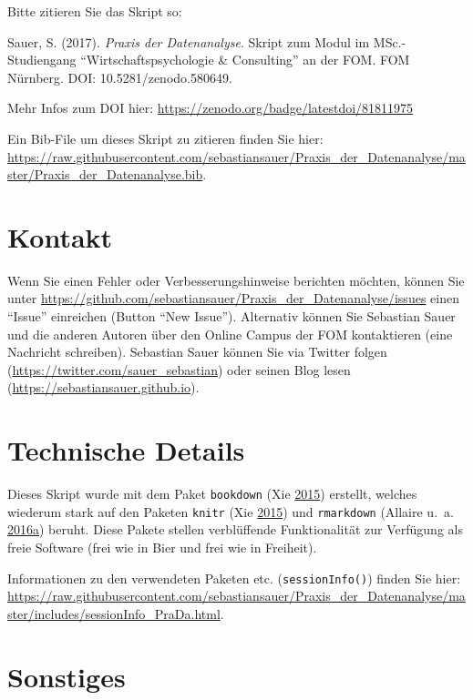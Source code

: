 \documentclass[12pt,ngerman,]{book}
\theoremstyle{definition}
\theoremstyle{definition}
\theoremstyle{remark}
\begin{document}
Bitte zitieren Sie das Skript so:

Sauer, S. (2017). \emph{Praxis der Datenanalyse}. Skript zum Modul im
MSc.-Studiengang ``Wirtschaftspsychologie \& Consulting'' an der FOM.
FOM Nürnberg. DOI: 10.5281/zenodo.580649.

Mehr Infos zum DOI hier:
\url{https://zenodo.org/badge/latestdoi/81811975}

Ein Bib-File um dieses Skript zu zitieren finden Sie hier:
\url{https://raw.githubusercontent.com/sebastiansauer/Praxis_der_Datenanalyse/master/Praxis_der_Datenanalyse.bib}.

\section{Kontakt}\label{kontakt}

Wenn Sie einen Fehler oder Verbesserungshinweise berichten möchten,
können Sie unter
\url{https://github.com/sebastiansauer/Praxis_der_Datenanalyse/issues}
einen ``Issue'' einreichen (Button ``New Issue''). Alternativ können Sie
Sebastian Sauer und die anderen Autoren über den Online Campus der FOM
kontaktieren (eine Nachricht schreiben). Sebastian Sauer können Sie via
Twitter folgen (\url{https://twitter.com/sauer_sebastian}) oder seinen
Blog lesen (\url{https://sebastiansauer.github.io}).

\section{Technische Details}\label{technische-details}

Dieses Skript wurde mit dem Paket \texttt{bookdown} (Xie
\protect\hyperlink{ref-xie2015}{2015}) erstellt, welches wiederum stark
auf den Paketen \texttt{knitr} (Xie
\protect\hyperlink{ref-xie2015}{2015}) und \texttt{rmarkdown} (Allaire
u.~a.
\protect\hyperlink{ref-rmarkdown}{2016}\protect\hyperlink{ref-rmarkdown}{a})
beruht. Diese Pakete stellen verblüffende Funktionalität zur Verfügung
als freie Software (frei wie in Bier und frei wie in Freiheit).

Informationen zu den verwendeten Paketen etc. (\texttt{sessionInfo()})
finden Sie hier:
\url{https://raw.githubusercontent.com/sebastiansauer/Praxis_der_Datenanalyse/master/includes/sessionInfo_PraDa.html}.

\section{Sonstiges}\label{sonstiges}
\end{document}
